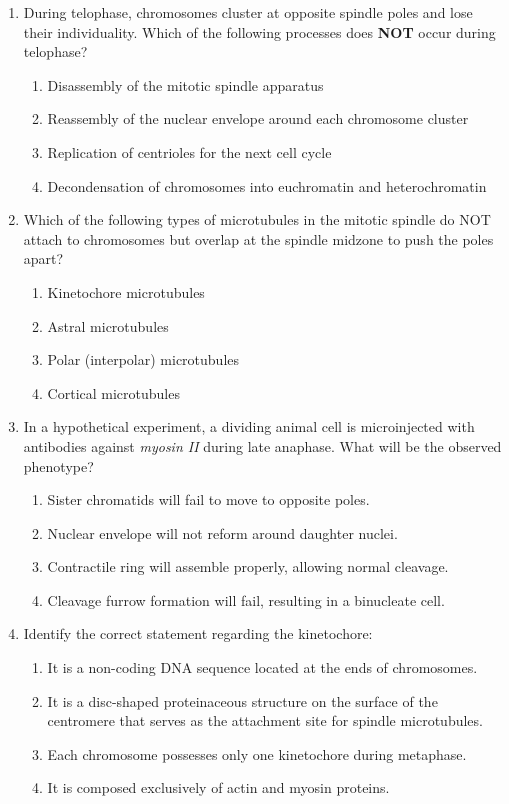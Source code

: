 \documentclass[11pt,a4paper]{article}
\begin{document}
\begin{enumerate}[label=\textbf{\arabic*.}, leftmargin=*]
\item During telophase, chromosomes cluster at opposite spindle poles and lose their individuality. Which of the following processes does \textbf{NOT} occur during telophase?
\begin{enumerate}[label=(\alph*)]
    \item Disassembly of the mitotic spindle apparatus
    \item Reassembly of the nuclear envelope around each chromosome cluster
    \item Replication of centrioles for the next cell cycle
    \item Decondensation of chromosomes into euchromatin and heterochromatin
\end{enumerate}

\item Which of the following types of microtubules in the mitotic spindle do NOT attach to chromosomes but overlap at the spindle midzone to push the poles apart?
\begin{enumerate}[label=(\alph*)]
    \item Kinetochore microtubules
    \item Astral microtubules
    \item Polar (interpolar) microtubules
    \item Cortical microtubules
\end{enumerate}

\item In a hypothetical experiment, a dividing animal cell is microinjected with antibodies against \textit{myosin II} during late anaphase. What will be the observed phenotype?
\begin{enumerate}[label=(\alph*)]
    \item Sister chromatids will fail to move to opposite poles.
    \item Nuclear envelope will not reform around daughter nuclei.
    \item Contractile ring will assemble properly, allowing normal cleavage.
    \item Cleavage furrow formation will fail, resulting in a binucleate cell.
\end{enumerate}

\item Identify the correct statement regarding the kinetochore:
\begin{enumerate}[label=(\alph*)]
    \item It is a non-coding DNA sequence located at the ends of chromosomes.
    \item It is a disc-shaped proteinaceous structure on the surface of the centromere that serves as the attachment site for spindle microtubules.
    \item Each chromosome possesses only one kinetochore during metaphase.
    \item It is composed exclusively of actin and myosin proteins.
\end{enumerate}


\end{enumerate}
\end{document}
